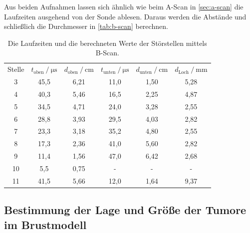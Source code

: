 Aus beiden Aufnahmen lassen sich ähnlich wie beim A-Scan in \autoref{sec:a-scan} die Laufzeiten ausgehend von der Sonde ablesen.
Daraus werden die Abstände und schließlich die Durchmesser in \autoref{tab:b-scan} berechnen.
\begin{table}[H]
  \centering
  \caption{Die Laufzeiten und die berechneten Werte der Störstellen mittels B-Scan.}
  \label{tab:b-scan}
  \begin{tabular}{c c c c c c}
    \toprule
    \multicolumn{1}{c}{Stelle} &
    \multicolumn{1}{c}{$t_\text{oben} \mathbin{/} \unit{\micro\second}$} &
    \multicolumn{1}{c}{$d_\text{oben} \mathbin{/} \unit{\centi\meter}$} &
    \multicolumn{1}{c}{$t_\text{unten} \mathbin{/} \unit{\micro\second}$} &
    \multicolumn{1}{c}{$d_\text{unten} \mathbin{/} \unit{\centi\meter}$} &
    \multicolumn{1}{c}{$d_\text{Loch} \mathbin{/} \unit{\milli\meter}$ } \\

    \cmidrule(lr){1-1} \cmidrule(lr){2-3} \cmidrule(lr){4-5} \cmidrule(lr){6-6} 
    
      3 &    45,5 &    6,21 &     11,0 &     1,50 &    5,28 \\
      4 &    40,3 &    5,46 &     16,5 &     2,25 &    4,87 \\
      5 &    34,5 &    4,71 &     24,0 &     3,28 &    2,55 \\
      6 &    28,8 &    3,93 &     29,5 &     4,03 &    2,82 \\
      7 &    23,3 &    3,18 &     35,2 &     4,80 &    2,55 \\
      8 &    17,3 &    2,36 &     41,0 &     5,60 &    2,82 \\
      9 &    11,4 &    1,56 &     47,0 &     6,42 &    2,68 \\
     10 &     5,5 &    0,75 &        - &        - &       - \\
     11 &    41,5 &    5,66 &     12,0 &     1,64 &    9,37 \\
    \bottomrule
  \end{tabular}
\end{table}


\subsection{Bestimmung der Lage und Größe der Tumore im Brustmodell}

